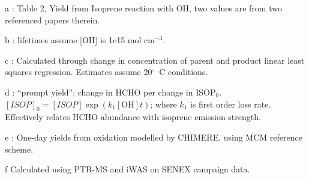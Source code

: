 \begin{table}
\begin{threeparttable}
\begin{tabular}{  l  l  l  l  }
            \bottomrule
          \end{tabular}
          \begin{tablenotes} %
            \item a \textcite{AtkinsonArey2003}: Table 2, Yield from Isoprene reaction with OH, two values are from two referenced papers therein.
            \item b \textcite{Palmer2003}: lifetimes assume [OH] is 1e15 mol cm$^{-3}$.
            \item c \parencite{Lee2006}: Calculated through change in concentration of parent and product linear least squares regression.
            Estimates assume 20$^\circ$~C conditions.
            \item d \textcite{Wolfe2016}: ``prompt yield'': change in HCHO per change in ISOP$_0$.
            $[ISOP]_0=[ISOP]\exp(k_1[\mathrm{OH}]t)$; where $k_1$ is first order loss rate.
            Effectively relates HCHO abundance with isoprene emission strength.
            \item e \textcite{Dufour2009}: One-day yields from oxidation modelled by CHIMERE, using MCM reference scheme.
            \item f Calculated using PTR-MS and iWAS on SENEX campaign data.
          \end{tablenotes}
          \label{BioIsop:method:tab_VOCLiteratureYields}
        \end{threeparttable} \end{table}

